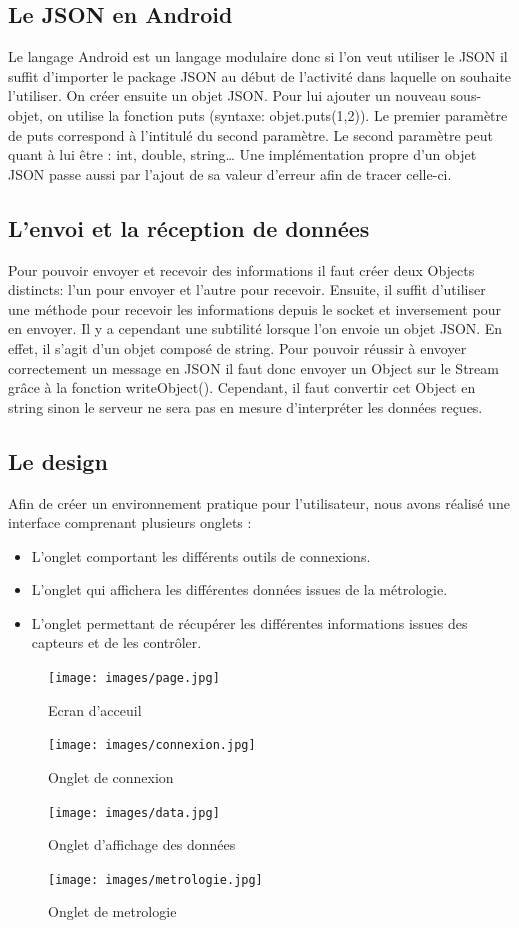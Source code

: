 \documentclass[a4paper,10pt]{article}
\begin{document}
\subsection{Le JSON en Android}
Le langage Android est un langage modulaire donc si l'on veut utiliser le JSON il suffit d’importer le package JSON au début de l’activité dans laquelle on souhaite l’utiliser. On créer ensuite un objet JSON. Pour lui ajouter un nouveau sous-objet, on utilise la fonction puts (syntaxe: objet.puts(1,2)). Le premier paramètre de puts correspond à l’intitulé du second paramètre. Le second paramètre peut quant à lui être : int, double, string… Une implémentation propre d’un objet JSON passe aussi par l’ajout de sa valeur d’erreur afin de tracer celle-ci.
\subsection{L’envoi et la réception de données}
Pour pouvoir envoyer et recevoir des informations il faut créer deux Objects distincts: l’un pour envoyer et l’autre pour recevoir. Ensuite, il suffit d’utiliser une méthode pour recevoir les informations depuis le socket et inversement pour en envoyer. Il y a cependant une subtilité lorsque l’on envoie un objet JSON. En effet, il s’agit d’un objet composé de string. Pour pouvoir réussir à envoyer correctement un message en JSON il faut donc envoyer un Object sur le Stream grâce à la fonction writeObject(). Cependant, il faut convertir cet Object en string sinon le serveur ne sera pas en mesure d’interpréter les données reçues.
\subsection{Le design} 
Afin de créer un environnement pratique pour l’utilisateur, nous avons réalisé une interface comprenant plusieurs onglets :
\begin{itemize}
	\item L’onglet comportant les différents outils de connexions.
	\item L’onglet qui affichera les différentes données issues de la métrologie.
	\item L’onglet permettant de récupérer les différentes informations issues des capteurs et de les contrôler.
\end{itemize}
\begin{figure}[H]
\centering\texttt{[image: images/page.jpg]}
\caption{Ecran d'acceuil}
\end{figure}
\begin{figure}[H]
\centering\texttt{[image: images/connexion.jpg]}
\caption{Onglet de connexion}
\end{figure}
\begin{figure}[H]
\centering\texttt{[image: images/data.jpg]}
\caption{Onglet d'affichage des données}
\end{figure}
\begin{figure}[H]
\centering\texttt{[image: images/metrologie.jpg]}
\caption{Onglet de metrologie}
\end{figure}
\end{document}
